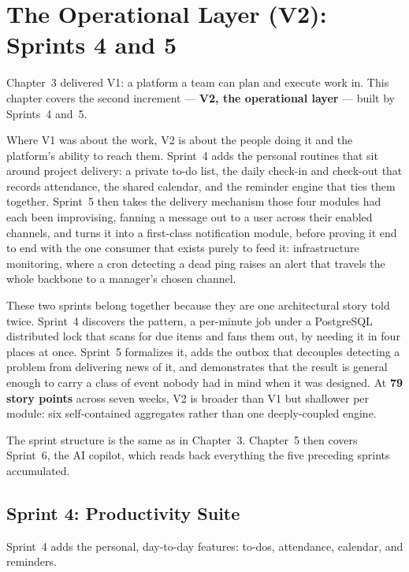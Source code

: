 
\chapter{The Operational Layer (V2): Sprints 4 and 5}

Chapter~3 delivered V1: a platform a team can plan and execute work in. This chapter covers the
second increment --- \textbf{V2, the operational layer} --- built by Sprints~4 and~5.

Where V1 was about the work, V2 is about the people doing it and the platform's ability to reach
them. Sprint~4 adds the personal routines that sit around project delivery: a private to-do list,
the daily check-in and check-out that records attendance, the shared calendar, and the reminder
engine that ties them together. Sprint~5 then takes the delivery mechanism those four modules had
each been improvising, fanning a message out to a user across their enabled channels, and turns
it into a first-class notification module, before proving it end to end with the one consumer
that exists purely to feed it: infrastructure monitoring, where a cron detecting a dead ping
raises an alert that travels the whole backbone to a manager's chosen channel.

These two sprints belong together because they are one architectural story told twice. Sprint~4
discovers the pattern, a per-minute job under a PostgreSQL distributed lock that scans for due
items and fans them out, by needing it in four places at once. Sprint~5 formalizes it, adds
the outbox that decouples detecting a problem from delivering news of it, and demonstrates that
the result is general enough to carry a class of event nobody had in mind when it was designed.
At \textbf{79 story points} across seven weeks, V2 is broader than V1 but shallower per module:
six self-contained aggregates rather than one deeply-coupled engine.

The sprint structure is the same as in Chapter~3. Chapter~5 then covers Sprint~6, the AI copilot,
which reads back everything the five preceding sprints accumulated.

\clearpage
\section{Sprint 4: Productivity Suite}

Sprint~4 adds the personal, day-to-day features: to-dos, attendance, calendar, and reminders.

